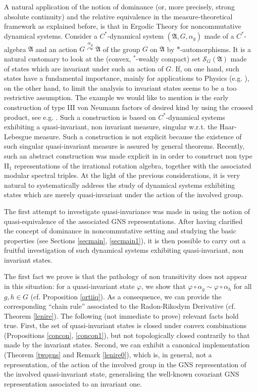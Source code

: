 \documentclass[12pt]{amsart}
\numberwithin{equation}{section}
\def\cs{{\mathcal S}}
\def\ga{{\mathfrak A}} \def\gpa{{\mathfrak a}}
\def\a{\alpha}
\def\f{\varphi}\def\ff{\phi} \def\F{\Phi}
\begin{document}
A natural application of the notion of dominance (or, more precisely, strong absolute continuity) and the relative equivalence in the measure-theoretical framework as explained before, is that in Ergodic Theory for noncommutative dynamical systems. Consider a $C^*$-dynamical system $(\ga, G,\a_g)$ made of a $C^*$-algebra $\ga$ and an action $G\stackrel{\a_g}{\curvearrowright}\ga$ of the group $G$ on $\ga$ by $*$-automorphisms. It is a natural customary to look at the (convex, ${}^*$-weakly compact) set $\cs_G(\ga)$ made of states which are invariant under such an action of $G$. If, on one hand, such states have a fundamental importance, mainly for applications to Physics (e.g. \cite{BR, E}), on the other hand, to limit the analysis to invariant states seems to be a too restrictive assumption. The example we would like to mention is the early construction of type III von Neumann factors of desired kind by using the crossed product, see e.g.  \cite{Kr}. Such a construction is based on $C^*$-dynamical systems exhibiting a quasi-invariant, non invariant measure, singular w.r.t. the Haar-Lebesgue measure. Such a construction is not explicit because the existence of such singular quasi-invariant measure is assured by general theorems. Recently, such an abstract construction was made explicit in \cite{FS} in order to construct non type II${}_1$ representations of the irrational rotation algebra, together with the associated modular spectral triples. At the light of the previous considerations, it is very natural to systematically address the study of dynamical systems exhibiting states which are merely quasi-invariant under the action of the involved group. 

The first attempt to investigate quasi-invariance was made in \cite{GK} using the notion of quasi-equivalence of the associated GNS representations. After having clarified the concept of dominance in noncommutative setting and studying the basic properties (see Sections \ref{secmain}, \ref{secmain1}), it is then possible to carry out a fruitful investigation of such dynamical systems exhibiting quasi-invariant, non invariant states.

The first fact we prove is that the pathology of non transitivity does not appear in this situation: for a quasi-invariant state $\f$, we show that $\f\circ\a_g\sim\f\circ\a_h$ for all $g,h\in G$ (cf. Proposition \ref{ortiiq}). As a consequence, we can provide the corresponding ``chain rule'' associated to the Radon-Rikodym Derivative (cf. Theorem \ref{lenire}). The following (not immediate to prove) relevant facts hold true. First, the set of quasi-invariant states is closed under convex combinations (Propositions \ref{concon}, \ref{concon1}), but not topologically closed contrarily to that made by the invariant states. Second, we can exhibit a canonical implementation (Theorem \ref{twogns} and Remark \ref{lenire0}),
which is, in general, not a representation, of the action of the involved group in the GNS representation of the involved quasi-invariant state, generalising the well-known covariant GNS representation associated to an invariant one.
\end{document}

